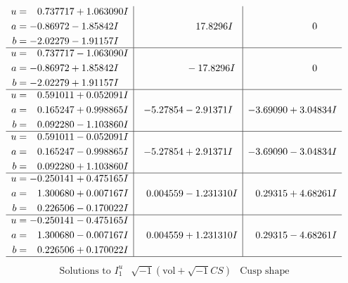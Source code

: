 \documentclass[1p]{elsarticle_modified}
\theoremstyle{definition}
\newcommand{\I}{\sqrt{-1}}
\begin{document}
$$\begin{array}{c|c|c}
\begin{aligned}
u &= \phantom{-}0.737717 + 1.063090 I \\
a &= -0.86972 - 1.85842 I \\
b &= -2.02279 - 1.91157 I\end{aligned}
 & \phantom{-0.000000 -}17.8296 I & \phantom{-0.000000 } 0 \\ \hline\begin{aligned}
u &= \phantom{-}0.737717 - 1.063090 I \\
a &= -0.86972 + 1.85842 I \\
b &= -2.02279 + 1.91157 I\end{aligned}
 & \phantom{-0.000000 } -17.8296 I & \phantom{-0.000000 } 0 \\ \hline\begin{aligned}
u &= \phantom{-}0.591011 + 0.052091 I \\
a &= \phantom{-}0.165247 + 0.998865 I \\
b &= \phantom{-}0.092280 - 1.103860 I\end{aligned}
 & -5.27854 - 2.91371 I & -3.69090 + 3.04834 I \\ \hline\begin{aligned}
u &= \phantom{-}0.591011 - 0.052091 I \\
a &= \phantom{-}0.165247 - 0.998865 I \\
b &= \phantom{-}0.092280 + 1.103860 I\end{aligned}
 & -5.27854 + 2.91371 I & -3.69090 - 3.04834 I \\ \hline\begin{aligned}
u &= -0.250141 + 0.475165 I \\
a &= \phantom{-}1.300680 + 0.007167 I \\
b &= \phantom{-}0.226506 - 0.170022 I\end{aligned}
 & \phantom{-}0.004559 - 1.231310 I & \phantom{-}0.29315 + 4.68261 I \\ \hline\begin{aligned}
u &= -0.250141 - 0.475165 I \\
a &= \phantom{-}1.300680 - 0.007167 I \\
b &= \phantom{-}0.226506 + 0.170022 I\end{aligned}
 & \phantom{-}0.004559 + 1.231310 I & \phantom{-}0.29315 - 4.68261 I\\
 \hline 
 \end{array}$$\newpage$$\begin{array}{c|c|c}  
\text{Solutions to }I^u_{1}& \I (\text{vol} + \sqrt{-1}CS) & \text{Cusp shape}\\

\end{array}$$
\end{document}
